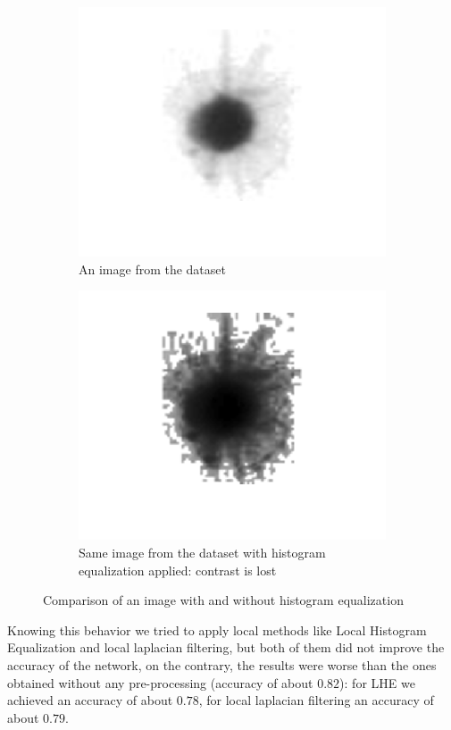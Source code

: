 \documentclass[letterpaper]{article} %
\begin{document}
\begin{figure}[h]
    \centering
    \begin{subfigure}{0.45\textwidth}
        \includegraphics[width=\textwidth]{histeq_gray_orig_ex_07.png}
        \caption{An image from the dataset}
    \end{subfigure}
    \begin{subfigure}{0.45\textwidth}
        \includegraphics[width=\textwidth]{histeq_ex_07.png}
        \caption{Same image from the dataset with histogram equalization applied: contrast is lost}
    \end{subfigure}
    \caption{Comparison of an image with and without histogram equalization}
    \label{fig:comparisonHistogramEqualization}
\end{figure}
Knowing this behavior we tried to apply local methods like Local Histogram Equalization and local laplacian filtering, but both of them did not improve the accuracy of the network, on the contrary, the results were worse than the ones obtained without any pre-processing (accuracy of about $0.82$): for LHE we achieved an accuracy of about $0.78$, for local laplacian filtering an accuracy of about $0.79$.
\end{document}
